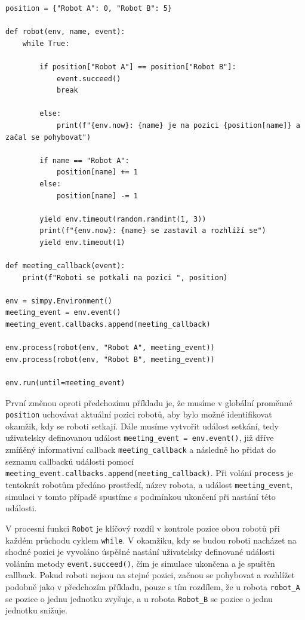 \documentclass[
  program=itp,
  biblatex,
  figures=false,
  glossaries,
  index
]{kidiplom}
\begin{document}
\begin{verbatim}
position = {"Robot A": 0, "Robot B": 5}

def robot(env, name, event):
    while True:

        if position["Robot A"] == position["Robot B"]: 
            event.succeed()  
            break

        else:
            print(f"{env.now}: {name} je na pozici {position[name]} a začal se pohybovat")

        if name == "Robot A":
            position[name] += 1
        else:
            position[name] -= 1

        yield env.timeout(random.randint(1, 3))
        print(f"{env.now}: {name} se zastavil a rozhlíží se")
        yield env.timeout(1)

def meeting_callback(event):
    print(f"Roboti se potkali na pozici ", position)

env = simpy.Environment()
meeting_event = env.event()
meeting_event.callbacks.append(meeting_callback)

env.process(robot(env, "Robot A", meeting_event))
env.process(robot(env, "Robot B", meeting_event))

env.run(until=meeting_event)
\end{verbatim}

První změnou oproti předchozímu příkladu je, že musíme v globální proměnné \texttt{position} uchovávat aktuální pozici robotů, aby bylo možné identifikovat okamžik, kdy se roboti setkají. Dále musíme vytvořit událost setkání, tedy uživatelsky definovanou událost \texttt{meeting\_event = env.event()}, již dříve zmíňěný informativní callback \texttt{meeting\_callback} a následně ho přidat do seznamu callbacků události pomocí \texttt{meeting\_event.callbacks.append(meeting\_callback)}. Při volání \texttt{process} je tentokrát robotům předáno prostředí, název robota, a událost \texttt{meeting\_event}, simulaci v tomto případě spustíme s podmínkou ukončení při nastání této události.

V procesní funkci \texttt{Robot} je klíčový rozdíl v kontrole pozice obou robotů při každém průchodu  cyklem \texttt{while}. V okamžiku, kdy se budou roboti nacházet na shodné pozici je vyvoláno úspěšné nastání uživatelsky definované události voláním metody \texttt{event.succeed()}, čím je simulace ukončena a je spuštěn callback. Pokud roboti nejsou na stejné pozici, začnou se pohybovat a rozhlížet podobně jako v předchozím příkladu, pouze s tím rozdílem, že u robota \texttt{robot\_A} se pozice o jednu jednotku zvyšuje, a u robota \texttt{Robot\_B} se pozice o jednu jednotku snižuje.
\end{document}
